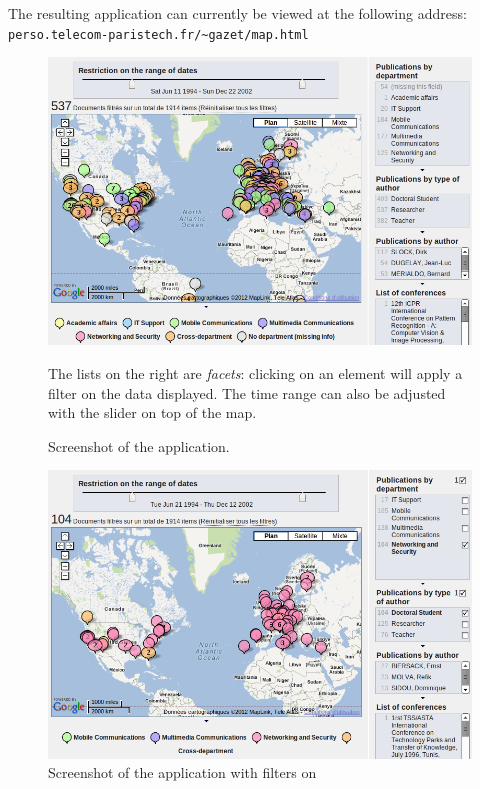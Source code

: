 \documentclass[a4paper,11pt]{report}
\begin{document}
The resulting application can currently be viewed at the following address:
\texttt{perso.telecom-paristech.fr/\textasciitilde{}gazet/map.html}
\begin{figure}[htbp]
\centering
\includegraphics[width=\textwidth]{map1}
\caption{Screenshot of the application.}
The lists on the right are {\emph{facets}}: clicking on an element will apply a filter on the data displayed. The time range can also be adjusted with the slider on top of the map.
\end{figure}
\begin{figure}[htbp]
\centering
\includegraphics[width=\textwidth]{map2}
\caption{Screenshot of the application with filters on}
\end{figure}
\end{document}
